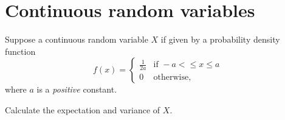 \documentclass[../main.tex]{subfiles}
\begin{document}
 \section{Continuous random variables}

\begin{example}
  Suppose a continuous random variable \(X\) if given by a probability density function 
  \[
    f(x) = 
    \begin{cases}
      \frac{1}{2a} & \text{if } -a < \le x \le a \\
      0 & \text{otherwise},
    \end{cases}
  \]
  where \(a\) is a \emph{positive} constant.

  Calculate the expectation and variance of \(X\).
\end{example}
\end{document}
